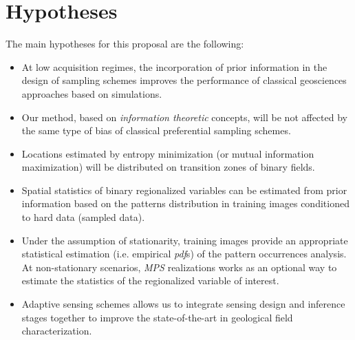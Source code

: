 \section{Hypotheses}

The main hypotheses for this proposal are the following:

\begin{itemize}
	\item At low acquisition regimes, the incorporation of prior information in the design of sampling schemes improves the performance of classical geosciences approaches based on simulations. 
	\item Our method, based on \emph{information theoretic} concepts, will be not affected by the same type of bias of classical preferential sampling schemes.
	\item Locations estimated by entropy minimization (or mutual information maximization) will be distributed on transition zones of binary fields.
	\item Spatial statistics of binary regionalized variables can be estimated from prior information based on the patterns distribution in training images conditioned to hard data (sampled data).
	\item Under the assumption of stationarity, training images provide an appropriate statistical estimation (i.e. empirical \emph{pdf}s) of the pattern occurrences analysis. At non-stationary scenarios, \emph{MPS} realizations works as an optional way to estimate the statistics of the regionalized variable of interest.
	\item Adaptive sensing schemes allows us to integrate sensing design and inference stages together to improve the state-of-the-art in geological field characterization.
\end{itemize}




























































